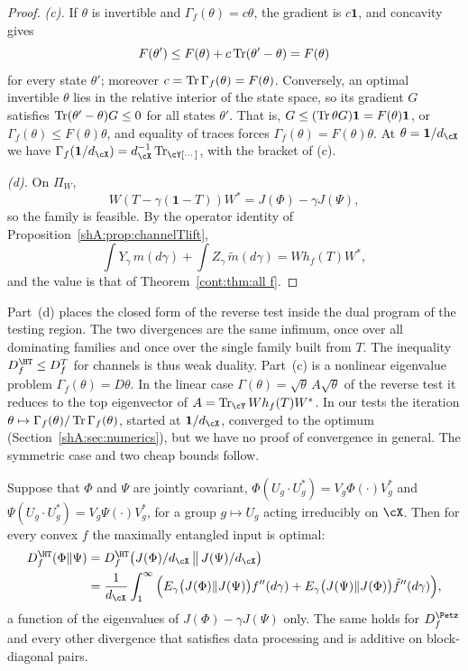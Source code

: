 \begin{proof}
\emph{(c).} If $\theta$ is invertible and $\Gamma_f(\theta)=c\theta$, the gradient is $c\mathbf 1$, and concavity gives
\[
F(\theta')\le F(\theta)+c\operatorname{Tr}(\theta'-\theta)=F(\theta)
\]
for every state $\theta'$; moreover $c=\operatorname{Tr}\Gamma_f(\theta)=F(\theta)$. Conversely, an optimal invertible $\theta$ lies in the relative interior of the state space, so its gradient $G$ satisfies $\operatorname{Tr}(\theta'-\theta)G\le0$ for all states $\theta'$. That is, $G\le(\operatorname{Tr}\theta G)\mathbf 1=F(\theta)\mathbf 1$, or $\Gamma_f(\theta)\le F(\theta)\theta$, and equality of traces forces $\Gamma_f(\theta)=F(\theta)\theta$. At $\theta=\mathbf 1/d_\cX$ we have $\Gamma_f(\mathbf 1/d_\cX)=d_\cX^{-1}\Tr_\cY[\cdots]$, with the bracket of (c).

\emph{(d).} On $\Pi_W$,
\[
W(T-\gamma(\mathbf 1-T))W^*=J(\Phi)-\gamma J(\Psi),
\]
so the family is feasible. By the operator identity of Proposition~\ref{shA:prop:channelTlift},
\[
\int Y_\gamma\,m(d\gamma)+\int Z_\gamma\,\tilde m(d\gamma)=Wh_f(T)W^*,
\]
and the value is that of Theorem~\ref{cont:thm:all f}.
\end{proof}

Part~(d) places the closed form of the reverse test inside the dual program of the testing region. The two divergences are the same infimum, once over all dominating families and once over the single family built from $T$. The inequality $D^\HT_f\le D^T_f$ for channels is thus weak duality. Part~(c) is a nonlinear eigenvalue problem $\Gamma_f(\theta)=D\theta$. In the linear case $\Gamma(\theta)=\sqrt\theta\,A\sqrt\theta$ of the reverse test it reduces to the top eigenvector of $A=\Tr_\cY Wh_f(T)W^*$. In our tests the iteration $\theta\mapsto\Gamma_f(\theta)/\operatorname{Tr}\Gamma_f(\theta)$, started at $\mathbf 1/d_\cX$, converged to the optimum (Section~\ref{shA:sec:numerics}), but we have no proof of convergence in general. The symmetric case and two cheap bounds follow.

\begin{proposition}\label{shA:prop:covariant}
Suppose that $\Phi$ and $\Psi$ are jointly covariant, $\Phi(U_g\cdot U_g^*)=V_g\Phi(\cdot)V_g^*$ and $\Psi(U_g\cdot U_g^*)=V_g\Psi(\cdot)V_g^*$, for a group $g\mapsto U_g$ acting irreducibly on $\cX$. Then for every convex $f$ the maximally entangled input is optimal:
\[
\begin{aligned}D^\HT_f(\Phi\|\Psi)&=D^\HT_f\big(J(\Phi)/d_\cX\,\big\|\,J(\Psi)/d_\cX\big)\\&=\frac1{d_\cX}\int_1^\infty\Big(E_\gamma\big(J(\Phi)\|J(\Psi)\big)f''(d\gamma)+E_\gamma\big(J(\Psi)\|J(\Phi)\big)\tilde f''(d\gamma)\Big),\end{aligned}
\]
a function of the eigenvalues of $J(\Phi)-\gamma J(\Psi)$ only. The same holds for $D^\Petz_f$ and every other divergence that satisfies data processing and is additive on block-diagonal pairs.
\end{proposition}

